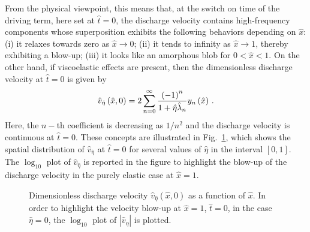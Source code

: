 \documentclass[12pt,a4paper]{amsart}
\theoremstyle{definition}
\newcommand{\hx}{\hat{x}}
\newcommand{\hatt}{\hat{t}}
\newcommand{\heta}{\hat{\eta}}
\newcommand{\hv}{\hat{v}}
\begin{document}
From the physical viewpoint, this means that,
at the switch on time of the driving term, here set at $\hatt=0$, the discharge velocity contains high-frequency
components whose superposition exhibits the following behaviors depending on $\hat{x}$:
(i) it relaxes
towards zero as $\hat{x}\rightarrow 0$; (ii) it tends to infinity as $\hat{x}%
\rightarrow 1$, thereby exhibiting a blow-up; (iii) it looks like an
amorphous blob for $0<\hat{x}<1$.
%
On the other hand, if viscoelastic effects are present, then the dimensionless discharge velocity at $\hatt=0$ is given by
\begin{equation*}
\hat{v}_{\hat{\eta}}\left( \hat{x},0\right) =2\sum_{n=0}^{\infty }\frac{%
\left( -1\right) ^{n}}{1+\hat{\eta}\hat{\lambda}_{n}}y_{n}\left( \hat{x}%
\right)\,.
\end{equation*}%
Here, the $n-$th coefficient is decreasing as $1/n^{2}$ and the discharge
velocity is continuous at $\hat{t}=0$. These concepts are illustrated in Fig.~\ref{fig:discharge_velocity_t_0}, which shows the spatial distribution of $\hat{v}_{\hat{\eta}}$ at $\hatt=0$ for several values of $\hat{\eta}$
in the interval $[0,1]$. The $\log_{10}$ plot of $\hat{v}_{\hat{\eta}}$ is reported in the figure to highlight
the blow-up of the discharge velocity in the purely elastic case at $\hat{x}=1$.
\begin{figure}[h!]
\begin{center}
\begin{center}
\end{center}
\caption{Dimensionless discharge velocity $\hv_{\heta}(\hx,0)$ as a function of
$\hx$. In order to highlight the velocity blow-up at $\hx=1$, $\hatt=0$, in the
case $\heta=0$, the $\log_{10}$ plot of $|\hv_{\eta}|$ is plotted.}
\label{fig:discharge_velocity_t_0}
\end{center}
\end{figure}
\end{document}
